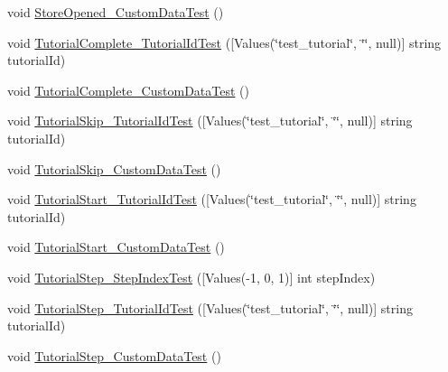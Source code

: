 \begin{DoxyCompactItemize}
\item 
void \mbox{\hyperlink{class_unity_engine_1_1_analytics_1_1_tests_1_1_analytics_event_tests_ac135990815afb3c7829a5c3e1944ae2b}{Store\+Opened\+\_\+\+Custom\+Data\+Test}} ()
\item 
void \mbox{\hyperlink{class_unity_engine_1_1_analytics_1_1_tests_1_1_analytics_event_tests_a16df6c222089741be25408ee6879216d}{Tutorial\+Complete\+\_\+\+Tutorial\+Id\+Test}} (\mbox{[}Values(\char`\"{}test\+\_\+tutorial\char`\"{}, \char`\"{}\char`\"{}, null)\mbox{]} string tutorial\+Id)
\item 
void \mbox{\hyperlink{class_unity_engine_1_1_analytics_1_1_tests_1_1_analytics_event_tests_aff1257bd6655a8b812e47375d4be49e8}{Tutorial\+Complete\+\_\+\+Custom\+Data\+Test}} ()
\item 
void \mbox{\hyperlink{class_unity_engine_1_1_analytics_1_1_tests_1_1_analytics_event_tests_acad73922d43ac0480821a1b79913293f}{Tutorial\+Skip\+\_\+\+Tutorial\+Id\+Test}} (\mbox{[}Values(\char`\"{}test\+\_\+tutorial\char`\"{}, \char`\"{}\char`\"{}, null)\mbox{]} string tutorial\+Id)
\item 
void \mbox{\hyperlink{class_unity_engine_1_1_analytics_1_1_tests_1_1_analytics_event_tests_a9acc2ba123076161ac483e668f0c7ab4}{Tutorial\+Skip\+\_\+\+Custom\+Data\+Test}} ()
\item 
void \mbox{\hyperlink{class_unity_engine_1_1_analytics_1_1_tests_1_1_analytics_event_tests_a8e4db6115e40a9c171d9a261acf57950}{Tutorial\+Start\+\_\+\+Tutorial\+Id\+Test}} (\mbox{[}Values(\char`\"{}test\+\_\+tutorial\char`\"{}, \char`\"{}\char`\"{}, null)\mbox{]} string tutorial\+Id)
\item 
void \mbox{\hyperlink{class_unity_engine_1_1_analytics_1_1_tests_1_1_analytics_event_tests_acfd1554417df524790ce94027abfa324}{Tutorial\+Start\+\_\+\+Custom\+Data\+Test}} ()
\item 
void \mbox{\hyperlink{class_unity_engine_1_1_analytics_1_1_tests_1_1_analytics_event_tests_ad3ef0ee96e8ade6805868146f80d341d}{Tutorial\+Step\+\_\+\+Step\+Index\+Test}} (\mbox{[}Values(-\/1, 0, 1)\mbox{]} int step\+Index)
\item 
void \mbox{\hyperlink{class_unity_engine_1_1_analytics_1_1_tests_1_1_analytics_event_tests_ac0eb32015c24f9cab304808077467018}{Tutorial\+Step\+\_\+\+Tutorial\+Id\+Test}} (\mbox{[}Values(\char`\"{}test\+\_\+tutorial\char`\"{}, \char`\"{}\char`\"{}, null)\mbox{]} string tutorial\+Id)
\item 
void \mbox{\hyperlink{class_unity_engine_1_1_analytics_1_1_tests_1_1_analytics_event_tests_a46ff31d49f33fa55c09fc36c9dc7f612}{Tutorial\+Step\+\_\+\+Custom\+Data\+Test}} ()

\end{DoxyCompactItemize}
